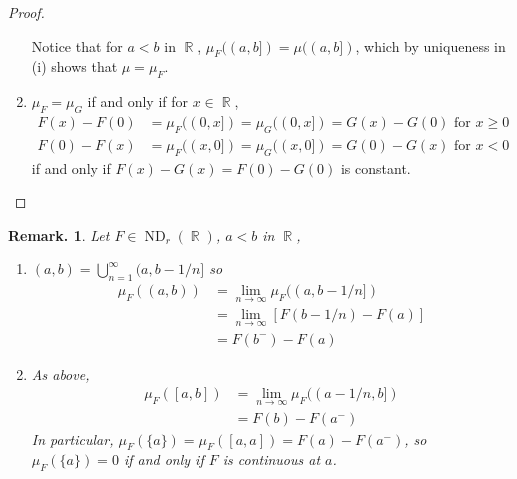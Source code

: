 \documentclass[11pt, a4paper]{memoir}
\DeclareMathOperator{\R}{{\mathbb{R}}}
\theoremstyle{change}
\theoremstyle{plain}
\theoremstyle{nonumberplain}
\newtheorem{remark}{Remark.}
\newtheorem{proof}{Proof}
\DeclareMathOperator{\ND}{ND}
\numberwithin{equation}{section}
\begin{document}
\begin{proof}
\begin{enumerate}[r]
            Notice that for $a<b$ in $\R$, $\mu_F((a,b])=\mu((a,b])$, which by uniqueness in (i) shows that $\mu=\mu_F$.
        \item $\mu_F=\mu_G$ if and only if for $x\in\R$,
            \begin{equation*}
                \begin{aligned}
                    F(x)-F(0)&=\mu_F((0,x])=\mu_G((0,x])=G(x)-G(0)\text{ for }x\geq 0\\
                    F(0)-F(x)&=\mu_F((x,0])=\mu_G((x,0])=G(0)-G(x)\text{ for }x<0
                \end{aligned}
            \end{equation*}
            if and only if $F(x)-G(x)=F(0)-G(0)$ is constant.
    \end{enumerate}
\end{proof}
\begin{remark}
    Let $F\in\ND_r(\R)$, $a<b$ in $\R$,
    \begin{enumerate}[nolistsep]
        \item $(a,b)=\bigcup_{n=1}^\infty(a,b-1/n]$ so
            \begin{align*}
                \mu_F((a,b)) &= \lim_{n\to\infty}\mu_F((a,b-1/n])\\ %
                             &= \lim_{n\to\infty}[F(b-1/n)-F(a)]\\
                             &= F(b^-)-F(a)
            \end{align*}
        \item As above,
            \begin{align*}
                \mu_F([a,b]) &= \lim_{n\to\infty}\mu_F((a-1/n,b])\\ %
                             &= F(b)-F(a^-)
            \end{align*}
            In particular, $\mu_F(\{a\})=\mu_F([a,a])=F(a)-F(a^-)$, so $\mu_F(\{a\})=0$ if and only if $F$ is continuous at $a$.
    \end{enumerate}
\end{remark}
\end{document}

